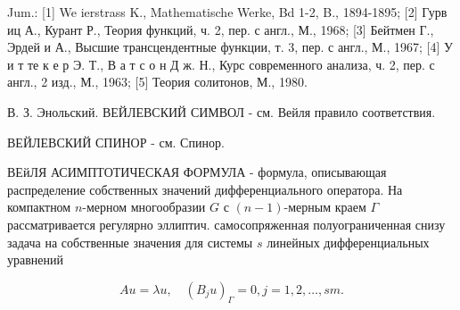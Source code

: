 \documentclass[10pt]{article}
\begin{document}
Jum.: [1] We ierstrass K., Mathematische Werke, Bd 1-2, B., 1894-1895; [2] Гурв иц А., Курант Р., Теория функций, ч. 2, пер. с англ., М., 1968; [3] Бейтмен Г., Эрдей и А., Высшие трансцендентные функции, т. 3, пер. с англ., М., 1967; [4] У и т те к е р Э. Т., В а т с о н Д ж. Н., Курс современного анализа, ч. 2, пер. с англ., 2 изд., М., 1963; [5] Теория солитонов, М., 1980.



В. З. Энольский. ВЕЙЛЕВСКИЙ СИМВОЛ - см. Вейля правило соответствия.



ВЕЙЛЕВСКИЙ СПИНОР - см. Спинор.



ВЕйЛЯ АСИМПТОТИЧЕСКАЯ ФОРМУЛА - формула, описывающая распределение собственных значений дифференциального оператора. На компактном $n$-мерном многообразии $G$ с $(n-1)$-мерным краем $\Gamma$ рассматривается регулярно эллиптич. самосопряженная полуограниченная снизу задача на собственные значения для системы $s$ линейных дифференциальных уравнений



\[

A u=\lambda u, \quad\left(B_{j} u\right)_{\Gamma}=0, j=1,2, \ldots, s m .

\]
\end{document}
